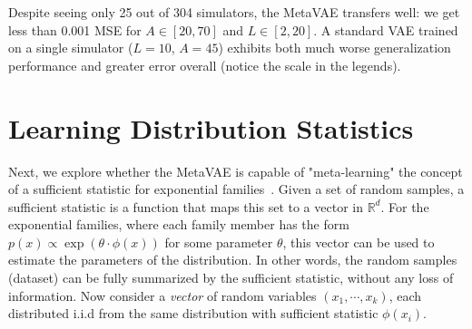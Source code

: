 Despite seeing only 25 out of 304 simulators, the MetaVAE transfers well: we get less than 0.001 MSE for $A \in [20,70]$ and $L \in [2,20]$. A standard VAE trained on a single simulator ($L=10$, $A=45$) exhibits both much worse generalization performance and greater error overall (notice the scale in the legends). 

\section{Learning Distribution Statistics}
Next, we explore whether the MetaVAE is capable of "meta-learning" the concept of a sufficient statistic for exponential families~\cite{wainwright2008graphical}.
Given a set of random samples, a sufficient statistic is a function that maps this set to a vector in $\mathbb{R}^d$. For the exponential families, where each family member has the form \(p(x) \propto \exp (\theta \cdot \phi(x))\) for some parameter \(\theta\), this vector can be used to estimate the parameters of the distribution.
In other words, the random samples (dataset) can be fully summarized by
the sufficient statistic, without any loss of information. 
Now consider a \textit{vector} of random variables $(x_1, \cdots, x_k)$, each distributed i.i.d from the same distribution with sufficient statistic $\phi(x_i)$. 
